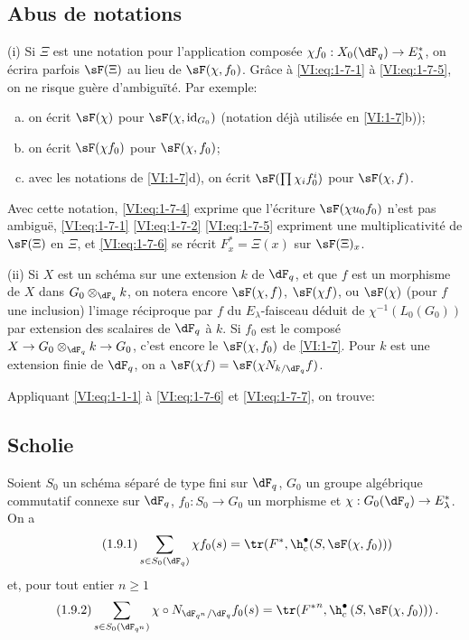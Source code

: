 \subsection{Abus de notations}\label{VI:1-8}

(i) Si $\Xi$ est une notation pour l'application composée 
$\chi f_0:X_0(\dF_q) \to E_\lambda^\ast$, on écrira parfois $\sF(\Xi)$ au 
lieu de $\sF(\chi,f_0)$. Grâce à \eqref{VI:eq:1-7-1} à \eqref{VI:eq:1-7-5}, 
on ne risque guère d'ambiguïté. Par exemple:
\begin{enumerate}[a)]
  \item on écrit $\sF(\chi)$ pour $\sF(\chi,\operatorname{id}_{G_0})$ 
    (notation déjà utilisée en \ref{VI:1-7}b)); 
  \item on écrit $\sF(\chi f_0)$ pour $\sF(\chi,f_0)$;
  \item avec les notations de \ref{VI:1-7}d), on écrit 
    $\sF(\prod \chi_i f_0^i)$ pour $\sF(\chi,f)$. 
\end{enumerate}

Avec cette notation, \eqref{VI:eq:1-7-4} exprime que l'écriture 
$\sF(\chi u_0 f_0)$ n'est pas ambiguë, \eqref{VI:eq:1-7-1} \eqref{VI:eq:1-7-2} 
\eqref{VI:eq:1-7-5} expriment une multiplicativité de $\sF(\Xi)$ en $\Xi$, 
et \eqref{VI:eq:1-7-6} se récrit $F_x^\ast = \Xi(x)$ sur $\sF(\Xi)_x$.

(ii) Si $X$ est un schéma sur une extension $k$ de $\dF_q$, et que $f$ est un 
morphisme de $X$ dans $G_0\otimes_{\dF_q} k$, on notera encore $\sF(\chi,f)$, 
$\sF(\chi f)$, ou $\sF(\chi)$ (pour $f$ une inclusion) l'image réciproque par 
$f$ du $E_\lambda$-faisceau déduit de $\chi^{-1}(L_0(G_0))$ par extension des 
scalaires de $\dF_q$ à $k$. Si $f_0$ est le composé 
$X\to G_0\otimes_{\dF_q} k \to G_0$, c'est encore le $\sF(\chi,f_0)$ de 
\ref{VI:1-7}. Pour $k$ est une extension finie de $\dF_q$, on a 
$\sF(\chi f) = \sF(\chi N_{k/\dF_q} f)$. 

Appliquant \eqref{VI:eq:1-1-1} à \eqref{VI:eq:1-7-6} et \eqref{VI:eq:1-7-7}, 
on trouve: 





\subsection{Scholie}\label{VI:1-9}
Soient $S_0$ un schéma séparé de type fini sur $\dF_q$, $G_0$ un groupe 
algébrique commutatif connexe sur $\dF_q$, $f_0:S_0\to G_0$ un morphisme et 
$\chi:G_0(\dF_q) \to E_\lambda^\ast$. On a 
\begin{equation*}\tag{1.9.1}\label{VI:eq:1-9-1}
  \sum_{s\in S_0(\dF_q)} \chi f_0(s) = \tr(F^\ast,\h_c^\bullet(S,\sF(\chi,f_0))) 
\end{equation*}
et, pour tout entier $n\geqslant 1$
\begin{equation*}\tag{1.9.2}\label{VI:eq:1-9-2}
  \sum_{s\in S_0(\dF_{q^n})} \chi\circ N_{\dF_{q^n}/\dF_q} f_0(s) = \tr({F^\ast}^n, \h_c^\bullet\left(S,\sF(\chi,f_0))\right) \text{.}
\end{equation*}





